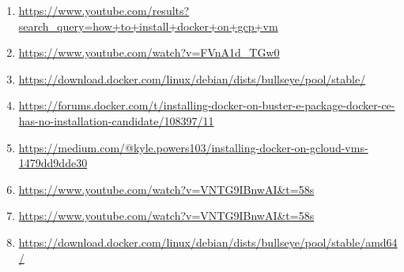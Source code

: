 \documentclass[12pt]{article}
\begin{document}
\begin{enumerate}[label=\arabic*.,itemsep=0pt,parsep=0pt]
      \item \url{https://www.youtube.com/results?search_query=how+to+install+docker+on+gcp+vm}
      \item \url{https://www.youtube.com/watch?v=FVnA1d_TGw0}
      \item \url{https://download.docker.com/linux/debian/dists/bullseye/pool/stable/}
      \item \url{https://forums.docker.com/t/installing-docker-on-buster-e-package-docker-ce-has-no-installation-candidate/108397/11}
      \item \url{https://medium.com/@kyle.powers103/installing-docker-on-gcloud-vms-1479dd9dde30}
      \item \url{https://www.youtube.com/watch?v=VNTG9IBnwAI&t=58s}
      \item \url{https://www.youtube.com/watch?v=VNTG9IBnwAI&t=58s}
      \item \url{https://download.docker.com/linux/debian/dists/bullseye/pool/stable/amd64/}

\end{enumerate}


\clearpage

\listoffigures

\clearpage
\end{document}
